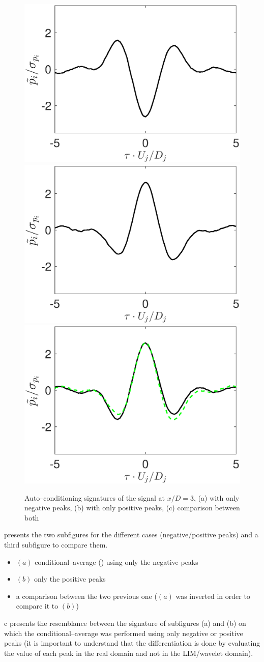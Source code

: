 \begin{figure}
	\centering
	\includegraphics[width=0.45\linewidth]{Figures/negativePeak.eps}%
	\includegraphics[width=0.45\linewidth]{Figures/positivePeak.eps}\\	
	\includegraphics[width=0.45\linewidth]{Figures/compPeaks}
	\caption{Auto--conditioning signatures of the signal at $x/D = 3$, (a) with only negative peaks, (b) with only positive peaks, (c) comparison between both} \label{fig:compPeaks}
\end{figure}
 presents the two subfigures for the different cases (negative/positive peaks) and a third subfigure to compare them.
\begin{itemize}
  \item $(a)$ conditional--average () using only the negative peaks
  \item $(b)$ only the positive peaks
  \item a comparison between the two previous one ($(a)$ was inverted in order to compare it to $(b)$)
\end{itemize}
c presents the resemblance between the signature of subfigures (a) and (b) on which the conditional--average was performed using only negative or positive peaks (it is important to understand that the differentiation is done by evaluating the value of each peak in the real domain and not in the LIM/wavelet domain). %
